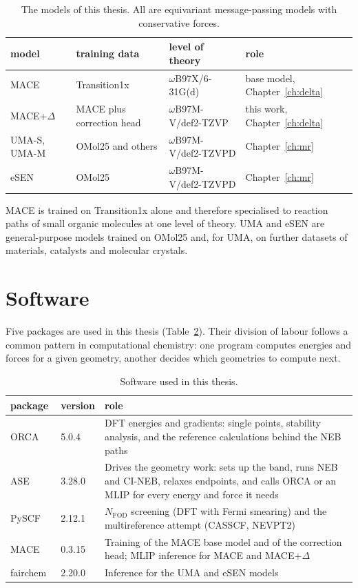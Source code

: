 \begin{table}[h]
\centering
\caption{The models of this thesis. All are equivariant message-passing
models with conservative forces.}
\label{tab:mlip-models}
\begin{tabular}{@{}llll@{}}
\toprule
model & training data & level of theory & role \\
\midrule
MACE & Transition1x & $\omega$B97X/6-31G(d) & base model, Chapter~\ref{ch:delta} \\
MACE+$\Delta$ & MACE plus correction head & $\omega$B97M-V/def2-TZVP & this work, Chapter~\ref{ch:delta} \\
UMA-S, UMA-M~\cite{uma} & OMol25 and others & $\omega$B97M-V/def2-TZVPD & Chapter~\ref{ch:mr} \\
eSEN~\cite{esen} & OMol25 & $\omega$B97M-V/def2-TZVPD & Chapter~\ref{ch:mr} \\
\bottomrule
\end{tabular}
\end{table}

MACE is trained on Transition1x alone and therefore specialised to reaction
paths of small organic molecules at one level of theory. UMA and eSEN are
general-purpose models trained on OMol25 and, for UMA, on further datasets
of materials, catalysts and molecular crystals.

\section{Software}
\label{sec:background-software}

Five packages are used in this thesis (Table~\ref{tab:software}). Their
division of labour follows a common pattern in computational chemistry:
one program computes energies and forces for a given geometry, another
decides which geometries to compute next.

\begin{table}[h]
\centering
\small
\caption{Software used in this thesis.}
\label{tab:software}
\begin{tabular}{@{}l l p{7.6cm}@{}}
\toprule
package & version & role \\
\midrule
ORCA~\cite{orca5} & 5.0.4 &
  DFT energies and gradients: single points, stability analysis,
  and the reference calculations behind the NEB paths \\
ASE~\cite{larsen2017ase} & 3.28.0 &
  Drives the geometry work: sets up the band, runs NEB and CI-NEB,
  relaxes endpoints, and calls ORCA or an MLIP for every energy and
  force it needs \\
PySCF~\cite{pyscf} & 2.12.1 &
  $N_\text{FOD}$ screening (DFT with Fermi smearing) and the
  multireference attempt (CASSCF, NEVPT2) \\
MACE~\cite{mace_code} & 0.3.15 &
  Training of the MACE base model and of the correction head; MLIP
  inference for MACE and MACE+$\Delta$ \\
fairchem~\cite{fairchem} & 2.20.0 &
  Inference for the UMA and eSEN models \\
\bottomrule
\end{tabular}
\end{table}

